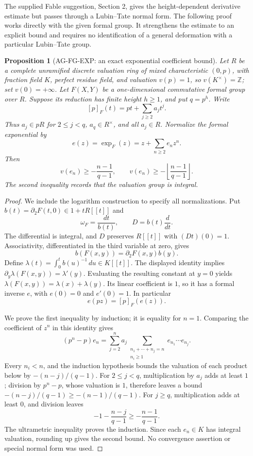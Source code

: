 \documentclass[11pt,a4paper]{article}
\newtheorem{proposition}{Proposition}
\begin{document}
The supplied Fable suggestion, Section 2, gives the height-dependent
derivative estimate but passes through a Lubin--Tate normal form.
The following proof works directly with the given formal group.
It strengthens the estimate to an explicit bound and requires no
identification of a general deformation with a particular
Lubin--Tate group.

\begin{proposition}[AG-FG-EXP: an exact exponential coefficient bound]
Let $R$ be a complete unramified discrete valuation ring of mixed
characteristic $(0,p)$, with fraction field $K$, perfect residue
field, and valuation $v(p)=1$, so $v(K^\times)=\mathbb Z$;
set $v(0)=+\infty$.
Let $F(X,Y)$ be a one-dimensional commutative formal group over
$R$. Suppose its reduction has finite height $h\ge1$, and put
$q=p^h$. Write
\[
 [p]_F(t)=pt+\sum_{j\ge2}a_jt^j.
\]
Thus $a_j\in pR$ for $2\le j<q$, $a_q\in R^\times$, and
all $a_j\in R$. Normalize the formal exponential by
\[
 e(z)=\exp_F(z)=z+\sum_{n\ge2}e_nz^n.
\]
Then
\[
 v(e_n)\ge-\frac{n-1}{q-1},\qquad
 v(e_n)\ge-\left\lfloor\frac{n-1}{q-1}\right\rfloor.
\]
The second inequality records that the valuation group is integral.
\end{proposition}
\begin{proof}
We include the logarithm construction to specify all normalizations.
Put $b(t)=\partial_2F(t,0)\in1+tR[[t]]$ and
\[
 \omega_F=\frac{dt}{b(t)},\qquad D=b(t)\frac{d}{dt}.
\]
The differential is integral, and $D$ preserves $R[[t]]$ with
$(Dt)(0)=1$. Associativity, differentiated in the third variable
at zero, gives
\[
 b(F(x,y))=\partial_2F(x,y)b(y).
\]
Define $\lambda(t)=\int_0^t b(u)^{-1}\,du\in K[[t]]$.
The displayed identity implies
$\partial_y\lambda(F(x,y))=\lambda'(y)$.
Evaluating the resulting constant at $y=0$ yields
$\lambda(F(x,y))=\lambda(x)+\lambda(y)$.
Its linear coefficient is $1$, so it has a formal inverse $e$,
with $e(0)=0$ and $e'(0)=1$. In particular
\[
 e(pz)=[p]_F(e(z)).
\]

We prove the first inequality by induction; it is equality for
$n=1$. Comparing the coefficient of $z^n$ in this identity gives
\[
 (p^n-p)e_n=
 \sum_{j=2}^n a_j
  \sum_{\substack{n_1+\cdots+n_j=n\\n_i\ge1}}
       e_{n_1}\cdots e_{n_j}.
\]
Every $n_i<n$, and the induction hypothesis bounds the valuation
of each product below by $-(n-j)/(q-1)$.
For $2\le j<q$, multiplication by $a_j$ adds at least $1$;
division by $p^n-p$, whose valuation is $1$, therefore leaves
a bound $-(n-j)/(q-1)\ge-(n-1)/(q-1)$.
For $j\ge q$, multiplication adds at least $0$, and division
leaves
\[
 -1-\frac{n-j}{q-1}\ge-\frac{n-1}{q-1}.
\]
The ultrametric inequality proves the induction. Since each
$e_n\in K$ has integral valuation, rounding up gives the second
bound. No convergence assertion or special normal form was used.
\end{proof}
\end{document}
